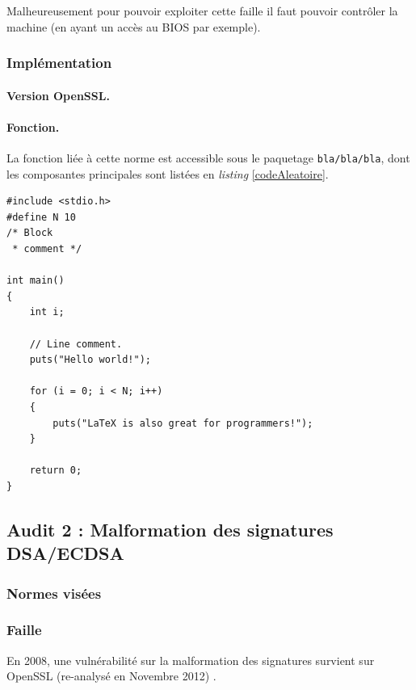 			Malheureusement pour pouvoir exploiter cette faille il faut pouvoir
			contrôler la machine (en ayant un accès au BIOS par exemple).
	
		
		\subsubsection{Implémentation}
			
			\paragraph{Version OpenSSL.\\}
			
			\paragraph{Fonction.\\}
			La fonction liée à cette norme est accessible sous le paquetage
			\texttt{bla/bla/bla}, dont les composantes principales sont 
			listées en \textit{listing} \ref{codeAleatoire}.
		
		
		\begin{lstlisting}[style=customc,caption=codeAleatoire.c, label=codeAleatoire]
#include <stdio.h>
#define N 10
/* Block
 * comment */
 
int main()
{
    int i;
 
    // Line comment.
    puts("Hello world!");
 
    for (i = 0; i < N; i++)
    {
        puts("LaTeX is also great for programmers!");
    }
 
    return 0;
}
		\end{lstlisting}
		
\subsection{Audit 2 : Malformation des signatures DSA/ECDSA}
		\subsubsection{Normes visées}
	
		
		\subsubsection{Faille}
		
			
		En 2008, une vulnérabilité sur la malformation des signatures 
		survient sur OpenSSL (re-analysé en Novembre 2012)
		\cite{openssl2009secadv} \cite{cve-2008-5077}.\\
	
